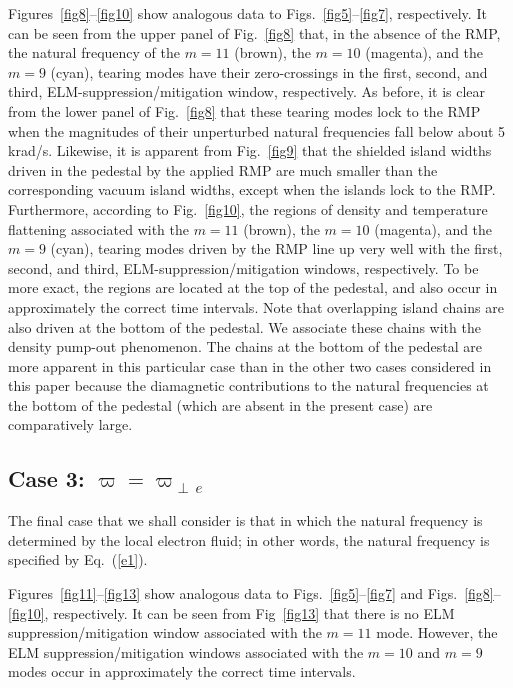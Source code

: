 \documentclass[12pt,prb,aps]{revtex4-1}
\begin{document}
Figures~\ref{fig8}--\ref{fig10} show analogous data to Figs.~\ref{fig5}--\ref{fig7}, respectively. It can be seen from the
upper panel of Fig.~\ref{fig8} that, in the absence of the RMP,  the natural frequency of the $m=11$ (brown), the $m=10$ (magenta), and the $m=9$ (cyan), tearing modes have their
zero-crossings in the  first, second, and third, ELM-suppression/mitigation window, respectively. As before, it is clear from the lower panel of Fig.~\ref{fig8} that these tearing modes lock
to the RMP when the magnitudes of their unperturbed natural frequencies fall below about 5 krad/s. 
Likewise, it is apparent from Fig.~\ref{fig9} that the shielded island widths driven in the pedestal by the applied
RMP are much smaller than the corresponding vacuum island widths, except when the islands lock to the RMP.
Furthermore, according to Fig.~\ref{fig10}, the regions of density and temperature flattening associated
with the $m=11$ (brown), the $m=10$ (magenta), and the $m=9$ (cyan), tearing modes driven by the RMP line up
very well with the first, second, and third, ELM-suppression/mitigation windows, respectively. To be more exact, the regions are located at
the top of the pedestal, and also occur in approximately the correct time intervals. Note that overlapping island chains
are also driven at the bottom of the pedestal. We associate these chains with the density pump-out phenomenon.\cite{hu,rf2} The chains at the bottom of the pedestal are more apparent
in this particular case than in the other two cases considered in this paper because the diamagnetic contributions to the natural frequencies at the bottom of the pedestal (which are absent
in the present case) are comparatively large. 

\subsection{Case 3: $\varpi=\varpi_{\perp\,e}$}
The final case that we shall consider is that in which the natural frequency is determined by the local electron fluid; 
in other words, the natural frequency is specified by Eq.~(\ref{e1}). 

Figures~\ref{fig11}--\ref{fig13} show analogous data to Figs.~\ref{fig5}--\ref{fig7} and Figs.~\ref{fig8}--\ref{fig10}, respectively.  
It can be seen from Fig~\ref{fig13} that there is no ELM suppression/mitigation window associated with the $m=11$ mode.  
However, the  ELM suppression/mitigation windows associated with the $m=10$ and $m=9$ modes occur in approximately the correct
time intervals. 
\end{document}
